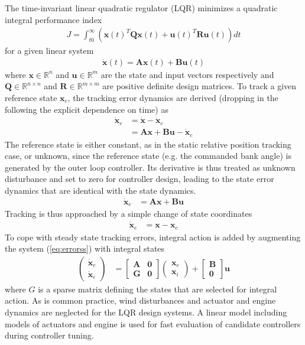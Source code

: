 \documentclass{ifacconf}
\newcommand{\mbf}[1]{\mathbf{#1}}
\providecommand{\mbf}[1]{\mathbf{#1}}
\begin{document}
\noindent
The time-invariant linear quadratic regulator (LQR) minimizes a quadratic integral performance index
\begin{align}
J = \int_{t0}^{\infty}(
\mathbf{x}(t)^T 
\mathbf{Q}
\mathbf{x}(t)
+
\mathbf{u}(t)^T 
\mathbf{R}
\mathbf{u}(t)
)
dt
\end{align}
for a given linear system
\begin{align}
\dot{\mathbf{x}}(t)
=
\mathbf{A}
\mathbf{x}(t)
+
\mathbf{B}
\mathbf{u}(t)
\end{align}
where $\mathbf{x} \in \mathbb{R}^n$ and $\mathbf{u} \in \mathbb{R}^m$ are the state and input vectors respectively and $\mathbf{Q} \in \mathbb{R}^{n\times n}$ and $\mathbf{R} \in \mathbb{R}^{m\times m}$ are positive definite design matrices.
To track a given reference state $\mbf{x}_c$, the tracking error dynamics are derived (dropping in the following the explicit dependence on time) as
\begin{align}
\dot{\mathbf{x}}_e
&=
\dot{\mbf{x}}
-
\dot{\mathbf{x}}_c \\
{}
&=
\mathbf{A}
\mathbf{x}
+
\mathbf{B}
\mathbf{u}
-
\dot{\mathbf{x}}_c 
\end{align}
The reference state is either constant, as in the static relative position tracking case, or unknown, since the reference state (e.g. the commanded bank angle) is generated by the outer loop controller. Its derivative is thus treated as unknown disturbance and set to zero for controller design, leading to the state error dynamics
that are identical with the state dynamics. 
\begin{align}
\dot{\mathbf{x}}_e
&=
\mathbf{A}
\mathbf{x}
+
\mathbf{B}
\mbf{u}
\end{align}
Tracking is thus approached by a simple change of state coordinates
\begin{align}
\dot{\mbf{x}}_e
&=
{\mbf{x}}
-
{\mbf{x}}_c 
\label{eq:errorss}
\end{align}
To cope with steady state tracking errors, integral action is added by augmenting the system (\ref{eq:errorss}) with integral states
\begin{align}
\begin{pmatrix}
\dot{\mbf{x}}_e \\
\dot{\mbf{x}}_i
\end{pmatrix}
&=
\begin{bmatrix}
\mbf{A} & \mbf{0} \\
\mbf{G} & \mbf{0}
\end{bmatrix}
\begin{pmatrix}
\mbf{x}_e \\
\mbf{x}_i
\end{pmatrix}
+
\begin{bmatrix}
\mbf{B} \\
\mbf{0}
\end{bmatrix}
\mbf{u}
\label{eq:integerrorss}
\end{align}
where $G$ is a sparse matrix defining the states that are selected for integral action. As is common practice, wind disturbances and actuator and engine dynamics are neglected for the LQR design systems. A linear model including models of actuators and engine is used for fast evaluation of candidate controllers during controller tuning.
\end{document}
